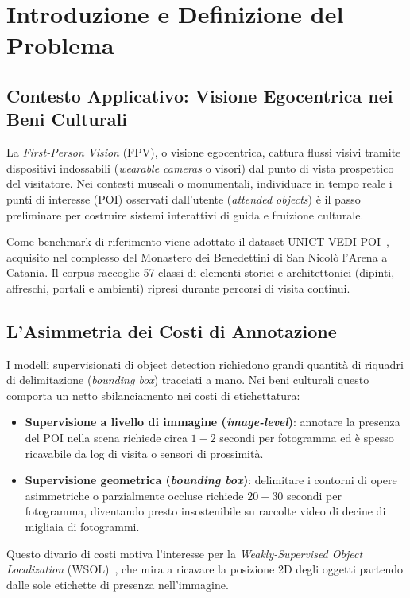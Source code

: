\chapter{Introduzione e Definizione del Problema}
\label{chap:introduzione}

\section{Contesto Applicativo: Visione Egocentrica nei Beni Culturali}
\label{sec:intro_contesto}
La \textit{First-Person Vision} (FPV), o visione egocentrica, cattura flussi visivi tramite dispositivi indossabili (\textit{wearable cameras} o visori) dal punto di vista prospettico del visitatore. Nei contesti museali o monumentali, individuare in tempo reale i punti di interesse (POI) osservati dall'utente (\textit{attended objects}) è il passo preliminare per costruire sistemi interattivi di guida e fruizione culturale.

Come benchmark di riferimento viene adottato il dataset UNICT-VEDI POI~\cite{ragusa2019egocentric}, acquisito nel complesso del Monastero dei Benedettini di San Nicolò l'Arena a Catania. Il corpus raccoglie 57 classi di elementi storici e architettonici (dipinti, affreschi, portali e ambienti) ripresi durante percorsi di visita continui.

\section{L'Asimmetria dei Costi di Annotazione}
\label{sec:intro_asimmetria}
I modelli supervisionati di object detection richiedono grandi quantità di riquadri di delimitazione (\textit{bounding box}) tracciati a mano. Nei beni culturali questo comporta un netto sbilanciamento nei costi di etichettatura:
\begin{itemize}
    \item \textbf{Supervisione a livello di immagine (\textit{image-level})}: annotare la presenza del POI nella scena richiede circa $1 - 2$ secondi per fotogramma ed è spesso ricavabile da log di visita o sensori di prossimità.
    \item \textbf{Supervisione geometrica (\textit{bounding box})}: delimitare i contorni di opere asimmetriche o parzialmente occluse richiede $20 - 30$ secondi per fotogramma, diventando presto insostenibile su raccolte video di decine di migliaia di fotogrammi.
\end{itemize}
Questo divario di costi motiva l'interesse per la \textit{Weakly-Supervised Object Localization} (WSOL)~\cite{choe2020evaluating,zhang2018adversarial,bilgi2021weakly}, che mira a ricavare la posizione 2D degli oggetti partendo dalle sole etichette di presenza nell'immagine.

